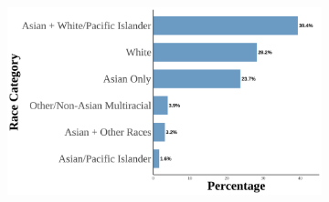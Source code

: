 \begin{landscape}
\begin{figure}[!htb]
\begin{subfigure}{.32\textwidth}
\includegraphics[width=1\linewidth]{histogram_asian_american_race_thirdgen_twoasiangran.png}
\end{subfigure}

\vspace{1cm}


\end{figure}
\end{landscape}
